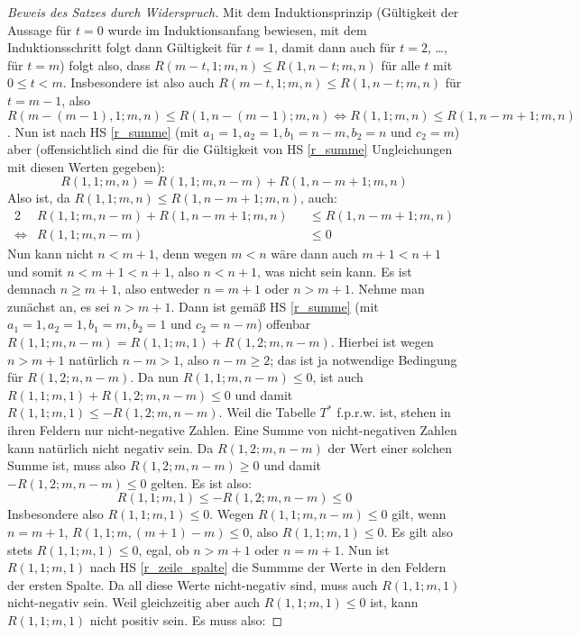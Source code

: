 \begin{proof}[Beweis des Satzes durch Widerspruch]
    Mit dem Induktionsprinzip (Gültigkeit der Aussage für $t=0$ wurde im Induktionsanfang bewiesen, mit dem 
    Induktionsschritt folgt dann Gültigkeit für $t=1$, damit dann auch für $t=2$, \dots, für $t=m$) folgt also, dass 
    $R(m-t, 1; m, n)\leq R(1, n-t; m, n)$ für alle $t$ mit $0\leq t<m$. Insbesondere ist also auch $R(m-t, 1; m, n)
    \leq R(1, n-t; m, n)$ für $t=m-1$, also $R(m-(m-1), 1; m, n)\leq R(1, n-(m-1); m, n)\Leftrightarrow R(1, 1; 
    m, n)\leq R(1, n-m+1; m, n)$. Nun ist nach HS \ref{r_summe} (mit $a_1=1, a_2=1, b_1=n-m, b_2=n$  und 
    $c_2=m$) aber (offensichtlich sind die für die Gültigkeit von HS \ref{r_summe} Ungleichungen mit diesen 
    Werten gegeben):
    \[
    R(1, 1; m, n)=R(1, 1; m, n-m)+R(1, n-m+1; m, n)
    \]
    Also ist, da $R(1, 1; m, n)\leq R(1, n-m+1; m, n)$, auch:
    \begin{alignat*}{2}
        &R(1, 1; m, n-m)+R(1, n-m+1; m, n)&&\leq R(1, n-m+1; m, n)\\
        \Leftrightarrow &R(1, 1; m, n-m)&&\leq 0
    \end{alignat*}
    Nun kann nicht $n<m+1$, denn wegen $m<n$ wäre dann auch $m+1<n+1$ und somit $n<m+1<n+1$, also 
    $n<n+1$, was nicht sein kann. Es ist demnach $n\geq m+1$, also entweder $n=m+1$ oder $n>m+1$. Nehme man zunächst 
    an, es sei $n>m+1$. Dann ist gemäß HS \ref{r_summe} (mit $a_1=1, a_2=1, b_1=m, b_2=1$ und $c_2=n-m$) 
    offenbar $R(1, 1; m, n-m)=R(1, 1; m, 1)+R(1, 2; m, n-m)$. Hierbei ist wegen $n>m+1$ natürlich $n-m>1$, also 
    $n-m\geq 2$; das ist ja notwendige Bedingung für $R(1, 2; n, n-m)$. Da nun $R(1, 1; m, n-m)\leq 0$, ist auch 
    $R(1, 1; m, 1)+R(1, 2; m, n-m)\leq 0$ und damit $R(1, 1; m, 1)\leq -R(1, 2; m, n-m)$. Weil die Tabelle $T^*$ 
    f.p.r.w. ist, stehen in ihren Feldern nur nicht-negative Zahlen. Eine Summe von nicht-negativen Zahlen kann 
    natürlich nicht negativ sein. Da $R(1, 2; m, n-m)$ der Wert einer solchen Summe ist, muss also $R(1, 2; m, n-m)
    \geq 0$ und damit $-R(1, 2; m, n-m)\leq 0$ gelten. Es ist also:
    \[
    R(1, 1; m, 1)\leq -R(1, 2; m, n-m)\leq 0
    \]
    Insbesondere also $R(1, 1; m, 1)\leq 0$. Wegen $R(1, 1; m, n-m)\leq 0$ gilt, wenn $n=m+1$, $R(1, 1; m, (m+1)-m)
    \leq 0$, also $R(1, 1; m, 1)\leq 0$. Es gilt also stets $R(1, 1; m, 1)\leq 0$, egal, ob $n>m+1$ oder $n=m+1$. 
    Nun ist $R(1, 1; m, 1)$ nach HS \ref{r_zeile_spalte} die Summme der Werte in den Feldern der ersten Spalte. Da 
    all diese Werte nicht-negativ sind, muss auch $R(1, 1; m, 1)$ nicht-negativ sein. Weil gleichzeitig aber auch 
    $R(1, 1; m, 1)\leq 0$ ist, kann $R(1, 1; m, 1)$ nicht positiv sein. Es muss also:

\end{proof}
